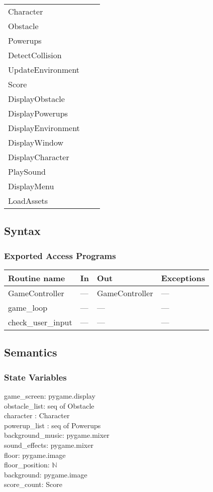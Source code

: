 \documentclass[12pt]{article}
\begin{document}
\begin{tabular}{lll}
    Character & \\
    Obstacle & \\
    Powerups & \\
    DetectCollision & \\
    UpdateEnvironment & \\
    Score & \\
    DisplayObstacle & \\
    DisplayPowerups & \\
    DisplayEnvironment & \\
    DisplayWindow & \\
    DisplayCharacter & \\
    PlaySound & \\
    DisplayMenu & \\
    LoadAssets 
\end{tabular}

\subsection* {Syntax}

\subsubsection* {Exported Access Programs}

\begin{tabular}{| l | l | l | l |}
\hline
\textbf{Routine name} & \textbf{In} & \textbf{Out} & \textbf{Exceptions}\\
\hline
    GameController & --- & GameController & ---\\
\hline
    game\_loop & --- & --- & ---\\
\hline
    check\_user\_input & --- & --- & ---\\
\hline
\end{tabular}

\subsection* {Semantics}

\subsubsection* {State Variables}

game\_screen: pygame.display\\
obstacle\_list: seq of Obstacle\\
character : Character \\
powerup\_list : seq of Powerups\\
background\_music: pygame.mixer\\
sound\_effects: pygame.mixer\\
floor: pygame.image\\
floor\_position: $\mathbb{N}$\\
background: pygame.image\\
score\_count: Score
\end{document}
